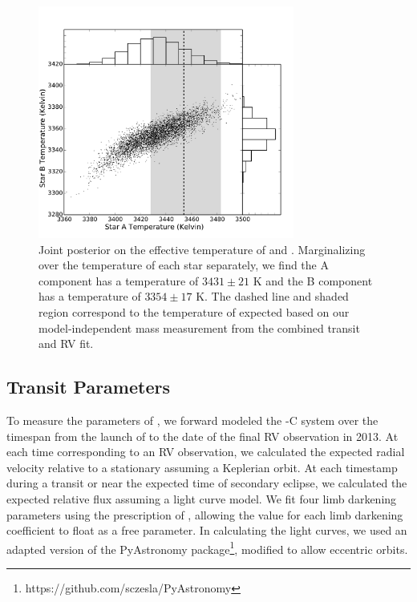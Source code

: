 \begin{figure}[htbp]
\centerline{\includegraphics[width=0.75\textwidth]{chapter4/f3.pdf}}
\caption[Joint posterior on the effective temperature of \LA\ and B]{Joint posterior on the effective temperature of \LA{} and \LB. 
Marginalizing over the temperature of each star separately, we find the A component has a temperature of $3431 \pm 21$ K and the B component has a temperature of $3354 \pm 17$ K. The dashed line and shaded region correspond to the temperature of \LA{} expected based on our model-independent mass measurement from the combined transit and RV fit.
}
\label{TempPlot}
\end{figure}





\subsection{Transit Parameters}

To measure the parameters of \LC, we forward modeled the \LA-C system over the timespan from the launch of \itk{} to the date of the final RV observation in 2013.
At each time corresponding to an RV observation, we calculated the expected radial velocity relative to a stationary \LB{} assuming a Keplerian orbit.
At each \itk{} timestamp during a transit or near the expected time of secondary eclipse, we calculated the expected relative flux assuming a \citet{Mandel02} light curve model. 
We fit four limb darkening parameters using the prescription of \citet{Claret11}, allowing the value for each limb darkening coefficient to float as a free parameter. 
In calculating the light curves, we used an adapted version of the PyAstronomy package\footnote{https://github.com/sczesla/PyAstronomy}, modified to allow eccentric orbits.


